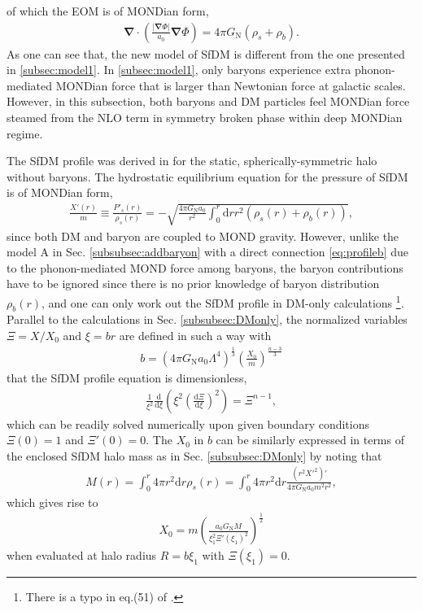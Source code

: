 \documentclass[aps,prd,twocolumn,10pt,groupedaddress]{revtex4-1}
\begin{document}
of which the EOM is of MONDian form,
\begin{align}
\mathbf{\nabla}\cdot\left(\frac{|\mathbf{\nabla}\Phi|}{a_0}\mathbf{\nabla}\Phi\right)=4\pi G_\mathrm{N}(\rho_s+\rho_b).
\end{align}
As one can see that, the new model of SfDM is different from the one presented in \ref{subsec:model1}. In \ref{subsec:model1}, only baryons experience extra phonon-mediated MONDian force that is larger than Newtonian force at galactic scales. However, in this subsection, both baryons and DM particles feel MONDian force steamed from the NLO term in symmetry broken phase within deep MONDian regime.

The SfDM profile was derived in \cite{Khoury:2016ehj} for the static, spherically-symmetric halo without baryons. The hydrostatic equilibrium equation for the pressure of SfDM is of MONDian form,
\begin{align}
\frac{X'(r)}{m}\equiv\frac{P'_s(r)}{\rho_s(r)}=-\sqrt{\frac{4\pi G_\mathrm{N}a_0}{r^2}\int_0^r\mathrm{d}r r^2(\rho_s(r)+\rho_b(r))},
\end{align}
since both DM and baryon are coupled to MOND gravity. However, unlike the model A in Sec. \ref{subsubsec:addbaryon} with a direct connection \eqref{eq:profileb} due to the phonon-mediated MOND force among baryons, the baryon contributions have to be ignored since there is no prior knowledge of baryon distribution $\rho_b(r)$, and one can only work out the SfDM profile in DM-only calculations \footnote{There is a typo in eq.(51) of \cite{Khoury:2016ehj}.}. Parallel to the calculations in Sec. \ref{subsubsec:DMonly}, the normalized variables $\Xi=X/X_0$ and $\xi=br$ are defined in such  a  way with
\begin{align}
b=(4\pi G_\mathrm{N}a_0\Lambda^4)^\frac13\left(\frac{X_0}{m}\right)^\frac{n-3}{3}
\end{align}
that the SfDM profile equation is dimensionless,
\begin{align}
\frac{1}{\xi^2}\frac{\mathrm{d}}{\mathrm{d}\xi}\left(\xi^2\left(\frac{\mathrm{d}\Xi}{\mathrm{d}\xi}\right)^2\right)=\Xi^{n-1},
\end{align}
which can be readily solved numerically upon given boundary conditions $\Xi(0)=1$ and $\Xi'(0)=0$. The $X_0$ in $b$ can be similarly expressed in terms of the enclosed SfDM halo mass as in Sec. \ref{subsubsec:DMonly} by noting that
\begin{align*}
M(r)=\int_0^r4\pi r^2\mathrm{d}r\rho_s(r)=\int_0^r4\pi r^2\mathrm{d}r \frac{(r^2X'^2)'}{4\pi G_\mathrm{N}a_0m^2r^2},
\end{align*}
which gives rise to
\begin{align}
X_0=m\left(\frac{a_0G_\mathrm{N}M}{\xi_1^2\Xi'(\xi_1)^2}\right)^\frac12
\end{align}
when evaluated at halo radius $R=b\xi_1$ with $\Xi(\xi_1)=0$.
\end{document}
